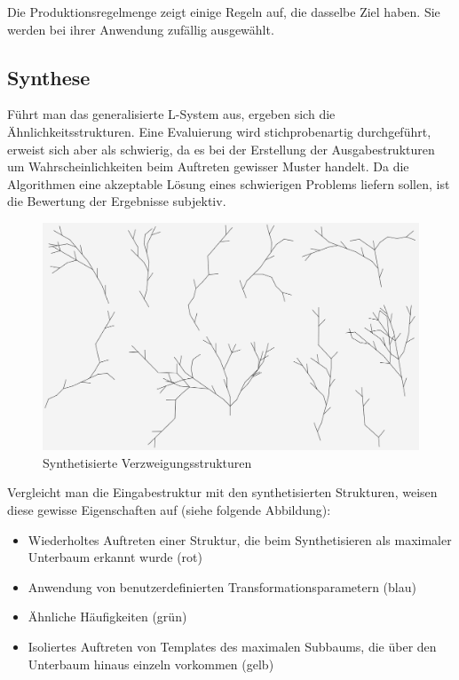 Die Produktionsregelmenge zeigt einige Regeln auf, die dasselbe Ziel haben.
Sie werden bei ihrer Anwendung zufällig ausgewählt.


\subsection*{Synthese}
Führt man das generalisierte L-System aus, ergeben sich die Ähnlichkeitsstrukturen.
Eine Evaluierung wird stichprobenartig durchgeführt, erweist sich aber als schwierig, da
es bei der Erstellung der Ausgabestrukturen um Wahrscheinlichkeiten beim Auftreten gewisser
Muster handelt.
Da die Algorithmen eine akzeptable Lösung eines schwierigen Problems liefern sollen,
ist die Bewertung der Ergebnisse subjektiv.
\begin{figure}[H]
    \centering
    \includegraphics[width=14.5cm]{../images/synthesis.png}
    \caption{Synthetisierte Verzweigungsstrukturen}
\end{figure}

Vergleicht man die Eingabestruktur mit den synthetisierten Strukturen, weisen diese
gewisse Eigenschaften auf (siehe folgende Abbildung):
\begin{itemize}
    \item Wiederholtes Auftreten einer Struktur, die beim Synthetisieren als maximaler Unterbaum
    erkannt wurde (rot)
    \item Anwendung von benutzerdefinierten Transformationsparametern (blau)
    \item Ähnliche Häufigkeiten (grün)
    \item Isoliertes Auftreten von Templates des maximalen Subbaums, die über den Unterbaum
    hinaus einzeln vorkommen (gelb)
\end{itemize}

